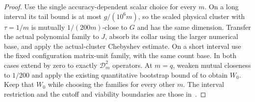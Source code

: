 \begin{proof}
    \leanok
    Use the single accuracy-dependent scalar choice for every $m$.
    On a long interval its tail bound is at most $g/(10^6m)$, so the scaled
    physical cluster with $\tau=1/m$ is mutually $1/(200m)$-close to $G$
    and has the same dimension. Transfer the actual polynomial family to
    $J$, absorb its collar using the larger numerical base, and apply
    the actual-cluster Chebyshev estimate. On a short interval use the
    fixed configuration matrix-unit family, with the same count base.
    In both cases extend by zero to exactly $\mathcal D_m^2$ operators.
    At $m=q$, weaken mutual closeness to $1/200$ and apply the existing
    quantitative bootstrap bound of
    \cite[``A quantitative bootstrap bound'']{QICLean2026Blueprint} to obtain
    $W_0$. Keep that $W_0$ while choosing the families for every other $m$.
    The interval restriction and the cutoff and viability boundaries are
    those in~\cite{gap:alvv16_bootstrap_constants,
        gap:alvv16_spectral_projector_boundary}.
\end{proof}


